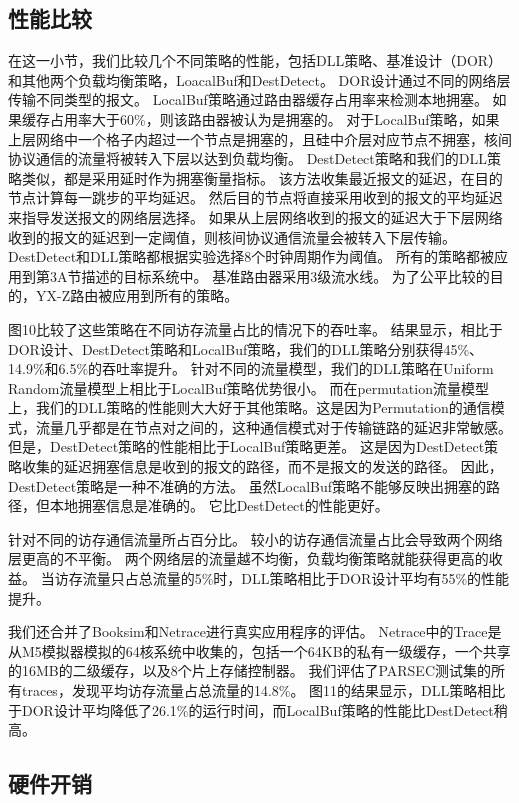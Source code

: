 \subsection{性能比较}

在这一小节，我们比较几个不同策略的性能，包括DLL策略、基准设计（DOR）和其他两个负载均衡策略，LoacalBuf和DestDetect。
DOR设计通过不同的网络层传输不同类型的报文。
LocalBuf策略通过路由器缓存占用率来检测本地拥塞。
如果缓存占用率大于60\%，则该路由器被认为是拥塞的。
对于LocalBuf策略，如果上层网络中一个格子内超过一个节点是拥塞的，且硅中介层对应节点不拥塞，核间协议通信的流量将被转入下层以达到负载均衡。
DestDetect策略和我们的DLL策略类似，都是采用延时作为拥塞衡量指标。
该方法收集最近报文的延迟，在目的节点计算每一跳步的平均延迟。
然后目的节点将直接采用收到的报文的平均延迟来指导发送报文的网络层选择。
如果从上层网络收到的报文的延迟大于下层网络收到的报文的延迟到一定阈值，则核间协议通信流量会被转入下层传输。
DestDetect和DLL策略都根据实验选择8个时钟周期作为阈值。
所有的策略都被应用到第3A节描述的目标系统中。
基准路由器采用3级流水线。
为了公平比较的目的，YX-Z路由被应用到所有的策略。

图10比较了这些策略在不同访存流量占比的情况下的吞吐率。
结果显示，相比于DOR设计、DestDetect策略和LocalBuf策略，我们的DLL策略分别获得45\%、14.9\%和6.5\%的吞吐率提升。
针对不同的流量模型，我们的DLL策略在Uniform Random流量模型上相比于LocalBuf策略优势很小。
而在permutation流量模型上，我们的DLL策略的性能则大大好于其他策略。这是因为Permutation的通信模式，流量几乎都是在节点对之间的，这种通信模式对于传输链路的延迟非常敏感。
但是，DestDetect策略的性能相比于LocalBuf策略更差。
这是因为DestDetect策略收集的延迟拥塞信息是收到的报文的路径，而不是报文的发送的路径。
因此，DestDetect策略是一种不准确的方法。
虽然LocalBuf策略不能够反映出拥塞的路径，但本地拥塞信息是准确的。
它比DestDetect的性能更好。

针对不同的访存通信流量所占百分比。
较小的访存通信流量占比会导致两个网络层更高的不平衡。
两个网络层的流量越不均衡，负载均衡策略就能获得更高的收益。
当访存流量只占总流量的5\%时，DLL策略相比于DOR设计平均有55\%的性能提升。

我们还合并了Booksim和Netrace进行真实应用程序的评估。
Netrace中的Trace是从M5模拟器模拟的64核系统中收集的，包括一个64KB的私有一级缓存，一个共享的16MB的二级缓存，以及8个片上存储控制器。
我们评估了PARSEC测试集的所有traces，发现平均访存流量占总流量的14.8\%。
图11的结果显示，DLL策略相比于DOR设计平均降低了26.1\%的运行时间，而LocalBuf策略的性能比DestDetect稍高。

\subsection{硬件开销}

